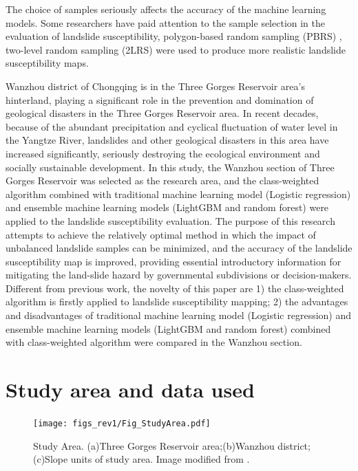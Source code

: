 \documentclass[a4paper,fleqn]{cas-sc}
\begin{document}
The choice of samples seriously affects the accuracy of the machine learning models. 
Some researchers have paid attention to the sample selection in the evaluation of landslide susceptibility, polygon-based random sampling (PBRS) \citep{San2014IJoAEOaG}, two-level random sampling (2LRS) \citep{Ada2017NH, Aktas2019C&G} were used to produce more realistic landslide susceptibility maps.

Wanzhou district of Chongqing is in the Three Gorges Reservoir area's hinterland, playing a significant role in the prevention and domination of geological disasters in the Three Gorges Reservoir area. 
In recent decades, because of the abundant precipitation and cyclical fluctuation of water level in the Yangtze River, landslides and other geological disasters in this area have increased significantly, seriously destroying the ecological environment and socially sustainable development. 
In this study, the Wanzhou section of Three Gorges Reservoir was selected as the research area, and the class-weighted algorithm combined with traditional machine learning model (Logistic regression) and ensemble machine learning models (LightGBM and random forest) were applied to the landslide susceptibility evaluation. 
The purpose of this research attempts to achieve the relatively optimal method in which the impact of unbalanced landslide samples can be minimized, and the accuracy of the landslide susceptibility map is improved, providing essential introductory information for mitigating the land-slide hazard by governmental subdivisions or decision-makers. 
Different from previous work, the novelty of this paper are 1) the class-weighted algorithm is firstly applied to landslide susceptibility mapping; 2) the advantages and disadvantages of traditional machine learning model (Logistic regression) and ensemble machine learning models (LightGBM and random forest) combined with class-weighted algorithm were compared in the Wanzhou section.

\section{Study area and data used}

\begin{figure}
    \centering
    \texttt{[image: figs\_rev1/Fig\_StudyArea.pdf]}
    \caption{Study Area. (a)Three Gorges Reservoir area;(b)Wanzhou district;(c)Slope units of study area. Image modified from \cite{Zhang2022}.}
    \label{fig:Figure1}
\end{figure}
\end{document}
